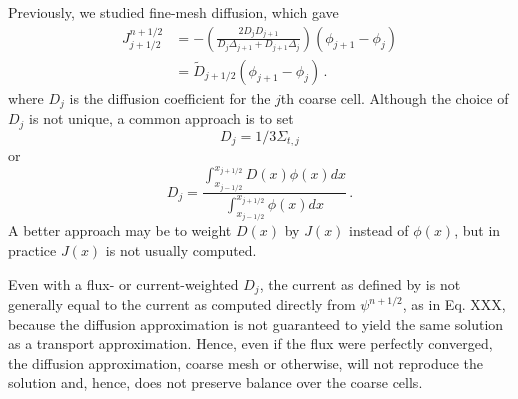 Previously, we studied fine-mesh diffusion, which gave
\begin{equation}
\begin{split}
  J^{n+1/2}_{j+1/2} &= - \left ( \frac{ 2 D_j D_{j+1} }
                                     {D_j \Delta_{j+1} + D_{j+1} \Delta_j}
                        \right )
                        (\phi_{j+1} - \phi_j) \\\
                    &= \tilde{D}_{j+1/2} (\phi_{j+1} - \phi_j) \, .
\end{split}                    
\label{eq:diffusion_current}
\end{equation}
where $D_j$ is the diffusion coefficient for the $j$th coarse cell.
Although the choice of $D_j$ is not unique, a common approach is 
to set 
\begin{equation}
 D_j = 1/3\Sigma_{t, j}
\end{equation}
or 
\begin{equation}
 D_{j} = \frac{\int^{x_{j+1/2}}_{x_{j-1/2}} D(x) \phi(x) dx}
              {\int^{x_{j+1/2}}_{x_{j-1/2}} \phi(x) dx} \, .
\end{equation}
A better approach may be to weight $D(x)$ by $J(x)$ instead of 
$\phi(x)$, but in practice $J(x)$ is not usually computed.

Even with a flux- or current-weighted $D_j$, the current as 
defined by  is not generally 
equal to the current as computed directly from 
$\psi^{n+1/2}$, as in Eq. XXX, because the diffusion approximation is 
not guaranteed to yield the same solution as a transport 
approximation.  Hence, even if the flux were perfectly converged, 
the diffusion approximation, coarse mesh or otherwise, will not 
reproduce the solution and, hence, does not preserve balance over
the coarse cells.


